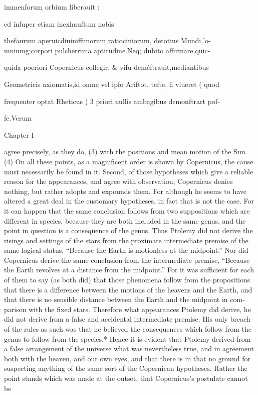 \documentclass{article}
\begin{document}
{{{{{{{{{{{{{{{{{{{immenforum orbium liberauit : {ed infuper etiam inexhauftum nobis

thefaurum aperuicdiuiniffimorum ratiociniorum, detotius Mundi,'o-
mniumg;corpori pulcherrima aptitudine.Neq; dubito affirmare,quic-

quida poeriori Copernicus collegir, & vifu deméftrauit,mediantibus

Geometricis axiomatis,id omne vel ipfo Ariftot. tefte, fi viueret ( quod

frequenter optat Rheticus ) 3 priori nullis ambagibus demonftrart pof-

fe.Verum

Chapter I

agree precisely, as they do, (3) with the positions and mean motion of the Sun. (4)
On all these points, as a magnificent order is shown by Copernicus, the cause
must necessarily be found in it. Second, of those hypotheses which give a reliable
reason for the appearances, and agree with observation, Copernicus denies
nothing, but rather adopts and expounds them. For although he seems to have
altered a great deal in the customary hypotheses, in fact that is not the case. For it
can happen that the same conclusion follows from two suppositions which are
different in species, because they are both included in the same genus, and the
point in question is a consequence of the genus. Thus Ptolemy did not derive the
risings and settings of the stars from the proximate intermediate premise of the
same logical status, “Because the Earth is motionless at the midpoint.” Nor did
Copernicus derive the same conclusion from the intermediate premise, “Because
the Earth revolves at a distance from the midpoint.” For it was sufficient for each
of them to say (as both did) that those phenomena follow from the propositions
that there is a difference between the motions of the heavens and the Earth, and
that there is no sensible distance between the Earth and the midpoint in com-
parison with the fixed stars. Therefore what appearances Ptolemy did derive, he
did not derive from a false and accidental intermediate premise. His only breach
of the rules as such was that he believed the consequences which follow from the
genus to follow from the species.* Hence it is evident that Ptolemy derived from a
false arrangement of the universe what was nevertheless true, and in agreement
both with the heaven, and our own eyes, and that there is in that no ground for
suspecting anything of the same sort of the Copernican hypotheses. Rather the
point stands which was made at the outset, that Copernicus’s postulate cannot be
}}}}}}}}}}}}}}}}}}}}
\end{document}
